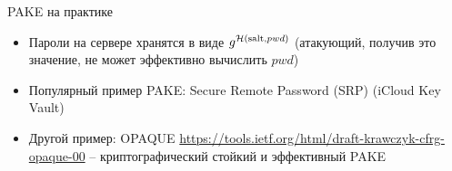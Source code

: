 \documentclass[usenames,dvipsnames,8pt,aspectratio=169]{beamer}
\begin{document}
\begin{frame}{PAKE на практике}
	\Large
	\begin{itemize}
		\itemsep 10pt
			\item Пароли на сервере хранятся в виде $g^{\mathcal{H}(\text{salt}, pwd)}$ (атакующий, получив это значение, не может эффективно вычислить $pwd$)
			\item Популярный пример PAKE: Secure Remote Password (SRP) (iCloud Key Vault)
			\item Другой пример: OPAQUE \url{https://tools.ietf.org/html/draft-krawczyk-cfrg-opaque-00} -- криптографический стойкий и эффективный PAKE
	\end{itemize}
\end{frame}
\end{document}
